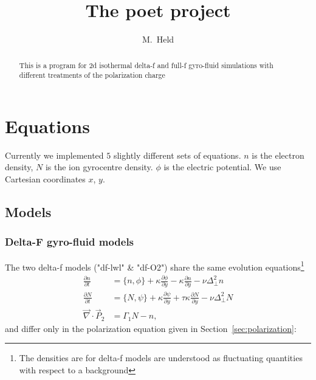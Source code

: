 

\usepackage{minted}



\title{The poet project}
\author{M.~Held}
\maketitle

\begin{abstract}
    This is a program for 2d isothermal delta-f and full-f gyro-fluid simulations with different treatments of the polarization charge ~\cite{HeldPhD}
\end{abstract}

\section{Equations}
Currently we implemented $5$ slightly different sets of equations. $n$ is the electron density, $N$ is the ion gyrocentre density. $\phi$ is the electric potential. We
use Cartesian coordinates $x$, $y$.
\subsection{Models}
\subsubsection{Delta-F gyro-fluid models}
The two delta-f models ("df-lwl" \& "df-O2") share the same evolution equations\footnote{The densities are for delta-f models are understood as fluctuating quantities with respect to a background} 
\begin{subequations}
\begin{align}
 \frac{\partial n}{\partial t}     &= 
    \{ n, \phi\} 
  + \kappa \frac{\partial \phi}{\partial y} 
  -\kappa \frac{\partial n}{\partial y}
  - \nu \Delta_{\perp}^2 n  \\
  \frac{\partial N}{\partial t} &=
  \{ N, \psi\} 
  + \kappa \frac{\partial \psi}{\partial y} 
  + \tau \kappa\frac{\partial N}{\partial y} -\nu\Delta_{\perp}^2 N \\
   \vec{\nabla}\cdot \vec{P}_2 &=  \Gamma_1 N -n, 
\end{align}
\end{subequations}
and differ only in the polarization equation given in Section~\ref{sec:polarization}:

